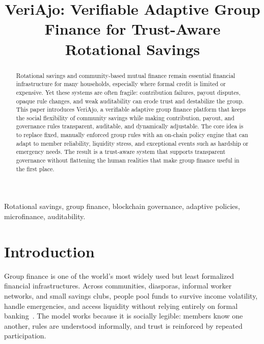 \documentclass[10pt, conference]{IEEEtran}
\begin{document}
\title{VeriAjo: Verifiable Adaptive Group Finance for Trust-Aware Rotational Savings}

\author{
}

\maketitle

\begin{abstract}
Rotational savings and community-based mutual finance remain essential financial infrastructure for many households, especially where formal credit is limited or expensive. Yet these systems are often fragile: contribution failures, payout disputes, opaque rule changes, and weak auditability can erode trust and destabilize the group. This paper introduces VeriAjo, a verifiable adaptive group finance platform that keeps the social flexibility of community savings while making contribution, payout, and governance rules transparent, auditable, and dynamically adjustable. The core idea is to replace fixed, manually enforced group rules with an on-chain policy engine that can adapt to member reliability, liquidity stress, and exceptional events such as hardship or emergency needs. The result is a trust-aware system that supports transparent governance without flattening the human realities that make group finance useful in the first place.
\end{abstract}

\begin{IEEEkeywords}
Rotational savings, group finance, blockchain governance, adaptive policies, microfinance, auditability.
\end{IEEEkeywords}

\section{Introduction}
Group finance is one of the world’s most widely used but least formalized financial infrastructures. Across communities, diasporas, informal worker networks, and small savings clubs, people pool funds to survive income volatility, handle emergencies, and access liquidity without relying entirely on formal banking~\cite{orr2006rotating,worldbank2022financialinclusion}. The model works because it is socially legible: members know one another, rules are understood informally, and trust is reinforced by repeated participation.
\end{document}
